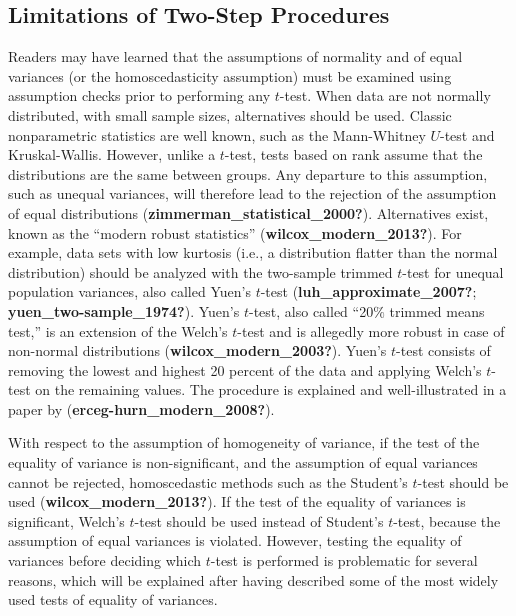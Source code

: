 \documentclass[
  english,
  man]{apa6}
\begin{document}
\hypertarget{limitations-of-two-step-procedures}{%
\subsection{Limitations of Two-Step Procedures}\label{limitations-of-two-step-procedures}}

Readers may have learned that the assumptions of normality and of equal variances (or the homoscedasticity assumption) must be examined using assumption checks prior to performing any \(t\)-test. When data are not normally distributed, with small sample sizes, alternatives should be used. Classic nonparametric statistics are well known, such as the Mann-Whitney \(U\)-test and Kruskal-Wallis. However, unlike a \(t\)-test, tests based on rank assume that the distributions are the same between groups. Any departure to this assumption, such as unequal variances, will therefore lead to the rejection of the assumption of equal distributions (\textbf{zimmerman\_statistical\_2000?}). Alternatives exist, known as the ``modern robust statistics'' (\textbf{wilcox\_modern\_2013?}). For example, data sets with low kurtosis (i.e., a distribution flatter than the normal distribution) should be analyzed with the two-sample trimmed \(t\)-test for unequal population variances, also called Yuen's \(t\)-test (\textbf{luh\_approximate\_2007?}; \textbf{yuen\_two-sample\_1974?}). Yuen's \(t\)-test, also called ``20\(\%\) trimmed means test,'' is an extension of the Welch's \(t\)-test and is allegedly more robust in case of non-normal distributions (\textbf{wilcox\_modern\_2003?}). Yuen's \(t\)-test consists of removing the lowest and highest 20 percent of the data and applying Welch's \(t\)-test on the remaining values. The procedure is explained and well-illustrated in a paper by (\textbf{erceg-hurn\_modern\_2008?}).

With respect to the assumption of homogeneity of variance, if the test of the equality of variance is non-significant, and the assumption of equal variances cannot be rejected, homoscedastic methods such as the Student's \(t\)-test should be used (\textbf{wilcox\_modern\_2013?}). If the test of the equality of variances is significant, Welch's \(t\)-test should be used instead of Student's \(t\)-test, because the assumption of equal variances is violated. However, testing the equality of variances before deciding which \(t\)-test is performed is problematic for several reasons, which will be explained after having described some of the most widely used tests of equality of variances.
\end{document}
